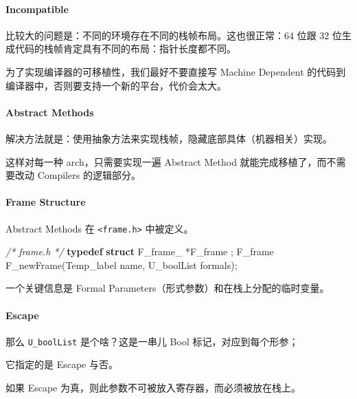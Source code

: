 \documentclass[
]{article}
\newenvironment{Shaded}{}{}
\newcommand{\CommentTok}[1]{\textcolor[rgb]{0.38,0.63,0.69}{\textit{#1}}}
\newcommand{\KeywordTok}[1]{\textcolor[rgb]{0.00,0.44,0.13}{\textbf{#1}}}
\newcommand{\NormalTok}[1]{#1}
\begin{document}
\hypertarget{header-n30}{%
\paragraph{Incompatible}\label{header-n30}}

比较大的问题是：不同的环境存在不同的栈帧布局。这也很正常：64 位跟 32
位生成代码的栈帧肯定具有不同的布局：指针长度都不同。

为了实现编译器的可移植性，我们最好不要直接写 Machine Dependent
的代码到编译器中，否则要支持一个新的平台，代价会太大。

\hypertarget{header-n33}{%
\paragraph{Abstract Methods}\label{header-n33}}

解决方法就是：使用抽象方法来实现栈帧，隐藏底部具体（机器相关）实现。

这样对每一种 arch，只需要实现一遍 Abstract Method
就能完成移植了，而不需要改动 Compilers 的逻辑部分。

\hypertarget{header-n36}{%
\paragraph{Frame Structure}\label{header-n36}}

Abstract Methods 在 \texttt{\textless{}frame.h\textgreater{}} 中被定义。

\begin{Shaded}
\begin{Highlighting}[]
\CommentTok{/* frame.h */}
\KeywordTok{typedef} \KeywordTok{struct}\NormalTok{ F_frame_ *F_frame ;}
\NormalTok{F_frame F_newFrame(Temp_label name, U_boolList formals);}
\end{Highlighting}
\end{Shaded}

一个关键信息是 Formal Parameters（形式参数）和在栈上分配的临时变量。

\hypertarget{header-n40}{%
\paragraph{Escape}\label{header-n40}}

那么 \texttt{U\_boolList} 是个啥？这是一串儿 Bool 标记，对应到每个形参；

它指定的是 Escape 与否。

如果 Escape 为真，则此参数不可被放入寄存器，而必须被放在栈上。
\end{document}
